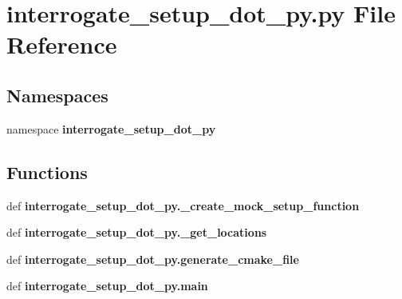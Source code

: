 \section{interrogate\-\_\-setup\-\_\-dot\-\_\-py.\-py \-File \-Reference}
\label{interrogate__setup__dot__py_8py}
\subsection*{\-Namespaces}
\begin{DoxyCompactItemize}
\item 
namespace {\bf interrogate\-\_\-setup\-\_\-dot\-\_\-py}
\end{DoxyCompactItemize}
\subsection*{\-Functions}
\begin{DoxyCompactItemize}
\item 
def {\bf interrogate\-\_\-setup\-\_\-dot\-\_\-py.\-\_\-create\-\_\-mock\-\_\-setup\-\_\-function}
\item 
def {\bf interrogate\-\_\-setup\-\_\-dot\-\_\-py.\-\_\-get\-\_\-locations}
\item 
def {\bf interrogate\-\_\-setup\-\_\-dot\-\_\-py.\-generate\-\_\-cmake\-\_\-file}
\item 
def {\bf interrogate\-\_\-setup\-\_\-dot\-\_\-py.\-main}
\end{DoxyCompactItemize}
